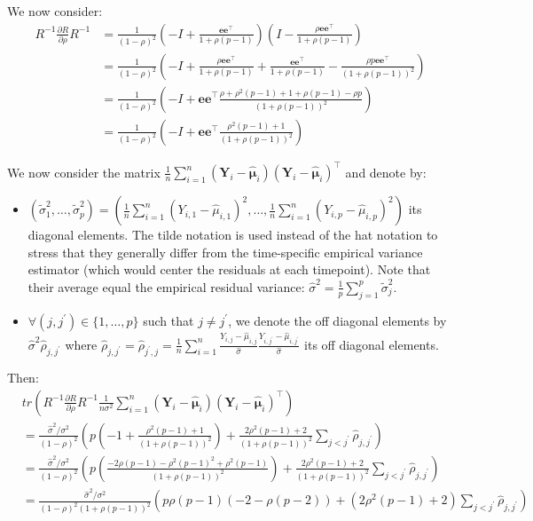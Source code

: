 \documentclass[12pt]{article}
\newcommand\Ve{\mathbf{e}}
\newcommand\VY{\mathbf{Y}}
\newcommand\Vmu{\boldsymbol{\mu}}
\newcommand\trans[1]{{#1}^\intercal}%
\begin{document}
We now consider:
\begin{align*}
R^{-1} \frac{\partial R}{\partial\rho} R^{-1} &= \frac{1}{(1-\rho)^2} \left(-I +  \frac{\Ve\trans{\Ve}}{1+\rho(p-1)}\right)\left(I - \frac{\rho \Ve\trans{\Ve}}{1+\rho(p-1)}\right) \\
&= \frac{1}{(1-\rho)^2} \left(-I + \frac{\rho \Ve\trans{\Ve}}{1+\rho(p-1)} + \frac{\Ve\trans{\Ve}}{1+\rho(p-1)} - \frac{\rho p \Ve\trans{\Ve}}{(1+\rho(p-1))^2}\right) \\
&= \frac{1}{(1-\rho)^2} \left(-I + \Ve\trans{\Ve} \frac{\rho+\rho^2(p-1) + 1+ \rho(p-1) - \rho p}{(1+\rho(p-1))^2}\right) \\
&= \frac{1}{(1-\rho)^2} \left(-I + \Ve\trans{\Ve} \frac{\rho^2(p-1) + 1}{(1+\rho(p-1))^2}\right) 
\end{align*}

We now consider the matrix \(\frac{1}{n}\sum_{i=1}^n (\VY_i-\widehat{\Vmu}_i)\trans{(\VY_i-\widehat{\Vmu}_i)}\) and denote by:
\begin{itemize}
\item \(\left(\widetilde{\sigma}^2_1,\ldots,\widetilde{\sigma}^2_p\right)=\left(\frac{1}{n}\sum_{i=1}^n
  (Y_{i,1}-\widehat{\mu}_{i,1})^2,\ldots,\frac{1}{n}\sum_{i=1}^n
  (Y_{i,p}-\widehat{\mu}_{i,p})^2\right)\) its diagonal elements. The tilde
notation is used instead of the hat notation to stress that they
generally differ from the time-specific empirical variance estimator
(which would center the residuals at each timepoint). Note that
their average equal the empirical residual variance:
\(\widehat{\sigma}^2 = \frac{1}{p} \sum_{j=1}^p
  \widetilde{\sigma}^2_j\).
\item \(\forall (j,j^{\prime})\in \{1,\ldots,p\}\) such that \(j \neq
  j^{\prime}\), we denote the off diagonal elements by
\(\widehat{\sigma}^2\widehat{\rho}_{j,j^{\prime}}\) where
\(\widehat{\rho}_{j,j^{\prime}} = \widehat{\rho}_{j^{\prime},j} =
  \frac{1}{n}\sum_{i=1}^n \frac{Y_{i,j}-\widehat{\mu}_{i,j}}{\widehat{\sigma}}
  \frac{Y_{i,j^{\prime}}-\widehat{\mu}_{i,j^{\prime}}}{\widehat{\sigma}}\) its
off diagonal elements.
\end{itemize}
Then:  
\begin{align*}
& tr \left( R^{-1} \frac{\partial R}{\partial\rho} R^{-1} \frac{1}{n\sigma^2}\sum_{i=1}^n  (\VY_i-\widehat{\Vmu}_i)\trans{(\VY_i-\widehat{\Vmu}_i)} \right) \\
& = \frac{\widehat{\sigma}^2/\sigma^2}{(1-\rho)^2}\left(p\left(-1+\frac{\rho^2(p-1) + 1}{(1+\rho(p-1))^2}\right) + \frac{2\rho^2(p-1) + 2}{(1+\rho(p-1))^2} \sum_{j < j^{\prime}}\widehat{\rho}_{j,j^{\prime}}\right) \\
&= \frac{\widehat{\sigma}^2/\sigma^2}{(1-\rho)^2}\left(p\left(\frac{-2\rho(p-1)-\rho^2(p-1)^2+\rho^2(p-1)}{(1+\rho(p-1))^2}\right) + \frac{2\rho^2(p-1) + 2}{(1+\rho(p-1))^2} \sum_{j < j^{\prime}}\widehat{\rho}_{j,j^{\prime}}\right) \\
&= \frac{\widehat{\sigma}^2/\sigma^2}{(1-\rho)^2(1+\rho(p-1))^2}\left(p\rho(p-1)\left(-2-\rho (p-2)\right) + \left(2\rho^2(p-1) + 2\right) \sum_{j < j^{\prime}}\widehat{\rho}_{j,j^{\prime}}\right)
\end{align*}
\end{document}
